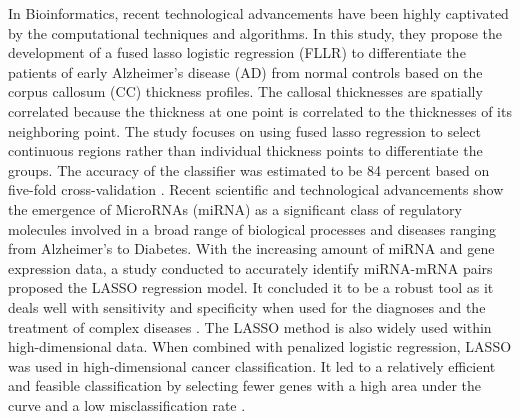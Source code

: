 In Bioinformatics, recent technological advancements have been highly captivated by the computational techniques and algorithms. In this study, they propose the development of a fused lasso logistic regression (FLLR) to differentiate the patients of early Alzheimer's disease (AD) from normal controls based on the corpus callosum (CC) thickness profiles. The callosal thicknesses are spatially correlated because the thickness at one point is correlated to the thicknesses of its neighboring point. The study focuses on using fused lasso regression to select continuous regions rather than individual thickness points to differentiate the groups. The accuracy of the classifier was estimated to be 84 percent based on five-fold cross-validation \cite{lee2014application}. Recent scientific and technological advancements show the emergence of MicroRNAs (miRNA) as a significant class of regulatory molecules involved in a broad range of biological processes and diseases ranging from Alzheimer's to Diabetes. With the increasing amount of miRNA and gene expression data, a study conducted to accurately identify miRNA-mRNA pairs proposed the LASSO regression model. It concluded it to be a robust tool as it deals well with sensitivity and specificity when used for the diagnoses and the treatment of complex diseases \cite{lu2011lasso}. The LASSO method is also widely used within high-dimensional data. When combined with penalized logistic regression, LASSO was used in high-dimensional cancer classification. It led to a relatively efficient and feasible classification by selecting fewer genes with a high area under the curve and a low misclassification rate \cite{algamal2015penalized}.

